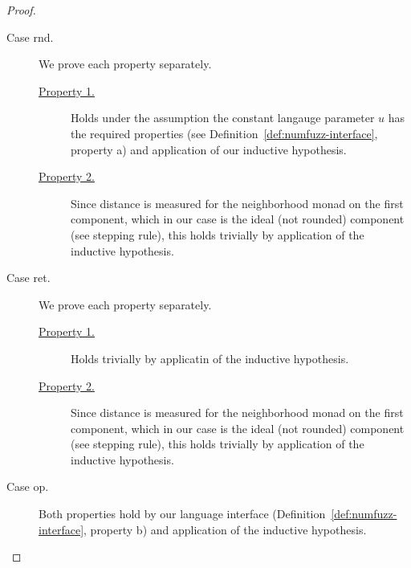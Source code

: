 \begin{proof}
\begin{description}
    \item[Case rnd.] 
      We prove each property separately.
      \begin{description}
        \item[\underline{Property 1.}]
          Holds under the assumption the constant langauge parameter $u$ has the
          required properties (see Definition~\ref{def:numfuzz-interface},
          property a) and application of our inductive hypothesis.
        \item[\underline{Property 2.}]
          Since distance is measured for the neighborhood monad on the first
          component, which in our case is the ideal (not rounded) component (see
          stepping rule), this holds trivially by application of the inductive
          hypothesis.
      \end{description}

    \item[Case ret.] 
      We prove each property separately.
      \begin{description}
        \item[\underline{Property 1.}]
          Holds trivially by applicatin of the inductive hypothesis.
        \item[\underline{Property 2.}]
          Since distance is measured for the neighborhood monad on the first
          component, which in our case is the ideal (not rounded) component (see
          stepping rule), this holds trivially by application of the inductive
          hypothesis.
      \end{description}

    \item[Case op.] 
      Both properties hold by our language interface
      (Definition~\ref{def:numfuzz-interface}, property b) and application of
      the inductive hypothesis.
  \end{description}
\end{proof}

%
